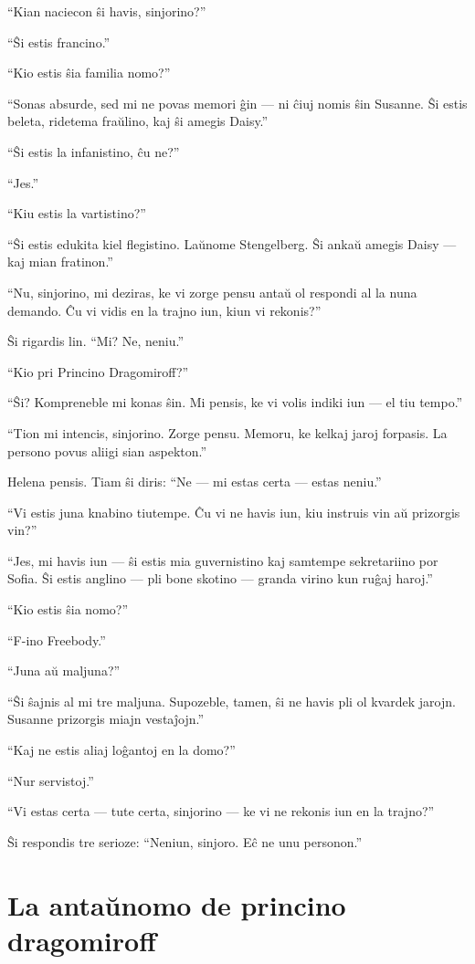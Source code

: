 ``Kian naciecon ŝi havis, sinjorino?''

``Ŝi estis francino.''

``Kio estis ŝia familia nomo?''

``Sonas absurde, sed mi ne povas memori ĝin --- ni ĉiuj nomis ŝin Susanne. Ŝi estis beleta, ridetema fraŭlino, kaj ŝi amegis Daisy.''

``Ŝi estis la infanistino, ĉu ne?''

``Jes.''

``Kiu estis la vartistino?''

``Ŝi estis edukita kiel flegistino. Laŭnome Stengelberg. Ŝi ankaŭ amegis Daisy --- kaj mian fratinon.''

``Nu, sinjorino, mi deziras, ke vi zorge pensu antaŭ ol respondi al la nuna demando. Ĉu vi vidis en la trajno iun, kiun vi rekonis?''

Ŝi rigardis lin. ``Mi? Ne, neniu.''

``Kio pri Princino Dragomiroff?''

``Ŝi? Kompreneble mi konas ŝin. Mi pensis, ke vi volis indiki iun --- el tiu tempo.''

``Tion mi intencis, sinjorino. Zorge pensu. Memoru, ke kelkaj jaroj forpasis. La persono povus aliigi sian aspekton.''

Helena pensis. Tiam ŝi diris: ``Ne --- mi estas certa --- estas neniu.''

``Vi estis juna knabino tiutempe. Ĉu vi ne havis iun, kiu instruis vin aŭ prizorgis vin?''

``Jes, mi havis iun --- ŝi estis mia guvernistino kaj samtempe sekretariino por Sofia. Ŝi estis anglino --- pli bone skotino --- granda virino kun ruĝaj haroj.''

``Kio estis ŝia nomo?''

``F-ino Freebody.''

``Juna aŭ maljuna?''

``Ŝi ŝajnis al mi tre maljuna. Supozeble, tamen, ŝi ne havis pli ol kvardek jarojn. Susanne prizorgis miajn vestaĵojn.''

``Kaj ne estis aliaj loĝantoj en la domo?''

``Nur servistoj.''

``Vi estas certa --- tute certa, sinjorino --- ke vi ne rekonis iun en la trajno?''

Ŝi respondis tre serioze: ``Neniun, sinjoro. Eĉ ne unu personon.''

\chapter[La antaŭnomo de princino dragomiroff]{La antaŭnomo de princino dragomiroff}


